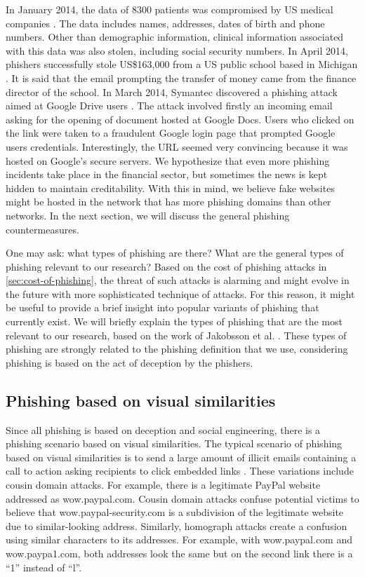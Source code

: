 In January 2014, the data of 8300 patients was compromised by US medical
companies \citep{adam:2014}. The data includes names, addresses,
dates of birth and phone numbers. Other than demographic information,
clinical information associated with this data was also stolen, including
social security numbers. In April 2014, phishers successfully stole
US\$163,000 from a US public school based in Michigan \citep{ashley:2014}.
It is said that the email prompting the transfer of money came from
the finance director of the school. In March 2014, Symantec discovered
a phishing attack aimed at Google Drive users \citep{teri:2014}.
The attack involved firstly an incoming email asking for the opening
of document hosted at Google Docs. Users who clicked on the link were
taken to a fraudulent Google login page that prompted Google users
credentials. Interestingly, the URL seemed very convincing because
it was hosted on Google's secure servers. We hypothesize that even
more phishing incidents take place in the financial sector, but sometimes
the news is kept hidden to maintain creditability. With this in mind,
we believe fake websites might be hosted in the network that has more
phishing domains than other networks. In the next section, we will
discuss the general phishing countermeasures.

One may ask: what types of phishing are there? What are the general
types of phishing relevant to our research? Based on the cost of phishing
attacks in \autoref{sec:cost-of-phishing}, the threat of such attacks
is alarming and might evolve in the future with more sophisticated
technique of attacks. For this reason, it might be useful to provide
a brief insight into popular variants of phishing that currently exist.
We will briefly explain the types of phishing that are the most relevant
to our research, based on the work of Jakobsson et al. \citep{jakobsson:2006}.
These types of phishing are strongly related to the phishing definition
that we use, considering phishing is based on the act of deception
by the phishers. 


\subsection{Phishing based on visual similarities}

Since all phishing is based on deception and social engineering, there
is a phishing scenario based on visual similarities. The typical scenario
of phishing based on visual similarities is to send a large amount
of illicit emails containing a call to action asking recipients to
click embedded links \citep{jakobsson:2006}. These variations include
cousin domain attacks. For example, there is a legitimate PayPal website
addressed as wow.paypal.com. Cousin domain attacks confuse potential
victims to believe that wow.paypal-security.com is a subdivision of
the legitimate website due to similar-looking address. Similarly,
homograph attacks create a confusion using similar characters to its
addresses. For example, with wow.paypal.com and wow.paypa1.com, both
addresses look the same but on the second link there is a ``1''
instead of ``l''.

